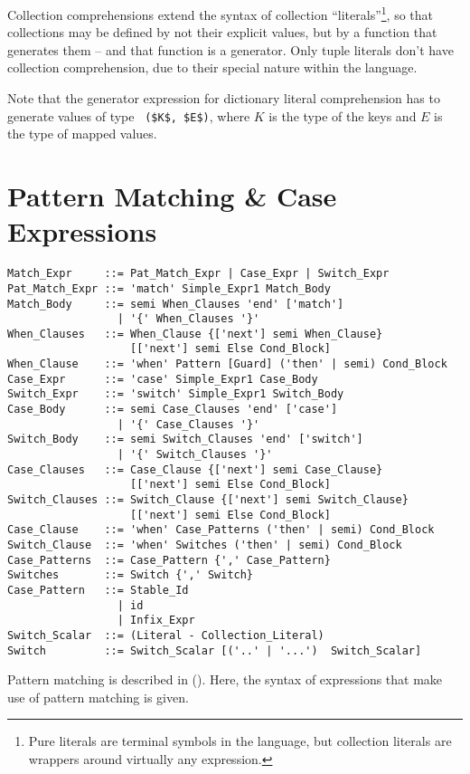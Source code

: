 Collection comprehensions extend the syntax of collection ``literals''\footnote{Pure literals are terminal symbols in the language, but collection literals are wrappers around virtually any expression.}, so that collections may be defined by not their explicit values, but by a function that generates them -- and that function is a generator. Only tuple literals don't have collection comprehension, due to their special nature within the language. 

Note that the generator expression for dictionary literal comprehension has to generate values of type ~\lstinline!($K$, $E$)!, where $K$ is the type of the keys and $E$ is the type of mapped values. 






\section{Pattern Matching \& Case Expressions}
\label{sec:case-exprs}

\syntax\begin{lstlisting}
Match_Expr     ::= Pat_Match_Expr | Case_Expr | Switch_Expr
Pat_Match_Expr ::= 'match' Simple_Expr1 Match_Body
Match_Body     ::= semi When_Clauses 'end' ['match']
                 | '{' When_Clauses '}'
When_Clauses   ::= When_Clause {['next'] semi When_Clause} 
                   [['next'] semi Else Cond_Block]
When_Clause    ::= 'when' Pattern [Guard] ('then' | semi) Cond_Block
Case_Expr      ::= 'case' Simple_Expr1 Case_Body
Switch_Expr    ::= 'switch' Simple_Expr1 Switch_Body
Case_Body      ::= semi Case_Clauses 'end' ['case']
                 | '{' Case_Clauses '}'
Switch_Body    ::= semi Switch_Clauses 'end' ['switch']
                 | '{' Switch_Clauses '}'
Case_Clauses   ::= Case_Clause {['next'] semi Case_Clause}
                   [['next'] semi Else Cond_Block]
Switch_Clauses ::= Switch_Clause {['next'] semi Switch_Clause}
                   [['next'] semi Else Cond_Block]
Case_Clause    ::= 'when' Case_Patterns ('then' | semi) Cond_Block
Switch_Clause  ::= 'when' Switches ('then' | semi) Cond_Block
Case_Patterns  ::= Case_Pattern {',' Case_Pattern}
Switches       ::= Switch {',' Switch}
Case_Pattern   ::= Stable_Id
                 | id
                 | Infix_Expr
Switch_Scalar  ::= (Literal - Collection_Literal)
Switch         ::= Switch_Scalar [('..' | '...')  Switch_Scalar]
\end{lstlisting}

Pattern matching is described in (). Here, the syntax of expressions that make use of pattern matching is given. 

